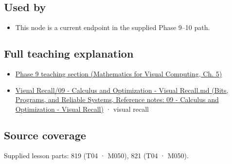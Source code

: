 \subsection{Used by}\label{appendix-e2d476574aab-used-by}

\hypertarget{appendix-e2d476574aab-used-by}{}

\begin{itemize}
\tightlist
\item
  This node is a current endpoint in the supplied Phase 9--10 path.
\end{itemize}

\subsection{Full teaching explanation}\label{appendix-e2d476574aab-full-teaching-explanation}

\hypertarget{appendix-e2d476574aab-full-teaching-explanation}{}

\begin{itemize}
\tightlist
\item
  \href{../02-Mathematics-for-Visual-Computing/main.pdf\#nameddest=02-foundations-ii-ch021-multivariable-derivatives-and-sensitivity-1}{Phase 9 teaching section (Mathematics for Visual Computing, Ch. 5)}
\item
  \href{../01-Bits-Programs-and-Reliable-Systems/main.pdf\#nameddest=appendix-adf48f5dc5c1}{Visual Recall/09 - Calculus and Optimization - Visual Recall.md (Bits, Programs, and Reliable Systems, Reference notes: 09 - Calculus and Optimization - Visual Recall)} · visual recall
\end{itemize}

\subsection{Source coverage}\label{appendix-e2d476574aab-source-coverage}

\hypertarget{appendix-e2d476574aab-source-coverage}{}

Supplied lesson parts: 819 (T04 · M050), 821 (T04 · M050).
